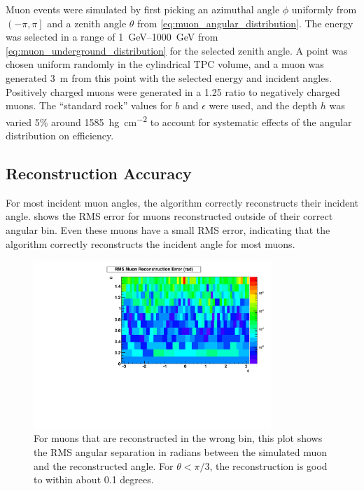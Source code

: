 \documentclass[herrin-thesis.tex]{subfiles}
\begin{document}
Muon events were simulated by first picking an azimuthal angle \(\phi\) uniformly from \(\left(-\pi, \pi\right]\) and a zenith angle \(\theta\) from \cref{eq:muon_angular_distribution}. The energy was selected in a range of \SIrange{1}{1000}{\GeV} from \cref{eq:muon_underground_distribution} for the selected zenith angle. A point was chosen uniform randomly in the cylindrical TPC volume, and a muon was generated \SI{3}{\meter} from this point with the selected energy and incident angles. Positively charged muons were generated in a 1.25 ratio to negatively charged muons. The ``standard rock'' values for \(b\) and \(\epsilon\) were used, and the depth \(h\) was varied 5\% around \SI{1585}{\hecto\gram\per\square\centi\meter} to account for systematic effects of the angular distribution on efficiency.

\subsection{Reconstruction Accuracy}
For most incident muon angles, the algorithm correctly reconstructs their incident angle.  shows the RMS error for muons reconstructed outside of their correct angular bin. Even these muons have a small RMS error, indicating that the algorithm correctly reconstructs the incident angle for most muons.

 \begin{figure}[htpb]
 \centering
 \includegraphics[width=0.8\textwidth]{./plots/muon_angular_accuracy.pdf}
 \caption[Accuracy of muon angle reconstruction]{For muons that are reconstructed in the wrong bin, this plot shows the RMS angular separation in radians between the simulated muon and the reconstructed angle. For \(\theta < \pi/3\), the reconstruction is good to within about 0.1 degrees.}
 \label{fig:muon_angular_accuracy}
 \end{figure}
\end{document}

